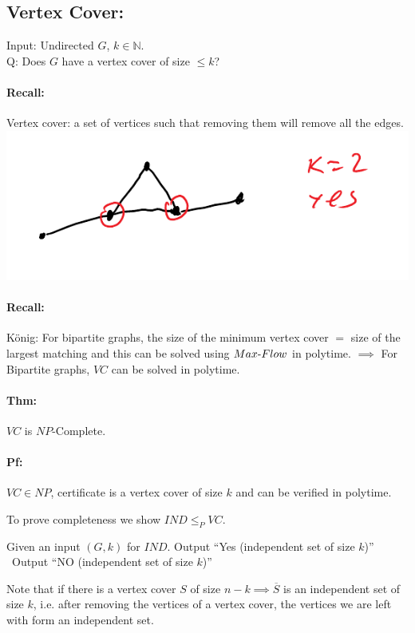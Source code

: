 \documentclass[12 pt]{article}
\begin{document}
          \subsection{Vertex Cover:}
          Input: Undirected $G$, $k\in \mathbb{N}$.
          \\ Q: Does $G$ have a vertex cover of size $\leq k$?
          \paragraph{Recall:} Vertex cover: a set of vertices such
          that removing them will remove all the edges.
          \\ \includegraphics[width=.9\textwidth]{i131.pdf}
          \paragraph{Recall:} K\"onig: For bipartite graphs, the size
          of the minimum vertex cover $=$ size of the largest matching
          and this can be solved using $Max\hbox{-}Flow$ in polytime.
          $\implies$ For Bipartite graphs, $VC$ can be solved in
          polytime.
          \paragraph{Thm:} $VC$ is $NP$-Complete.
          \paragraph{Pf:} $VC\in NP$, certificate is a vertex cover of
          size $k$ and can be verified in polytime.

          To prove completeness we show $IND \leq_P VC$.
          \begin{algorithmic}
            \State Given an input $(G,k)$ for $IND$.
             Output ``Yes (independent set of size $k$)''
            \Else \ Output ``NO (independent set of size $k$)''
            \EndIf
          \end{algorithmic}
          Note that if there is a vertex cover $S$ of size $n-k
          \implies \overline{S}$ is an independent set of size $k$, i.e.
          after removing the vertices of a vertex cover, the
          vertices we are left with form an independent set.
\end{document}
